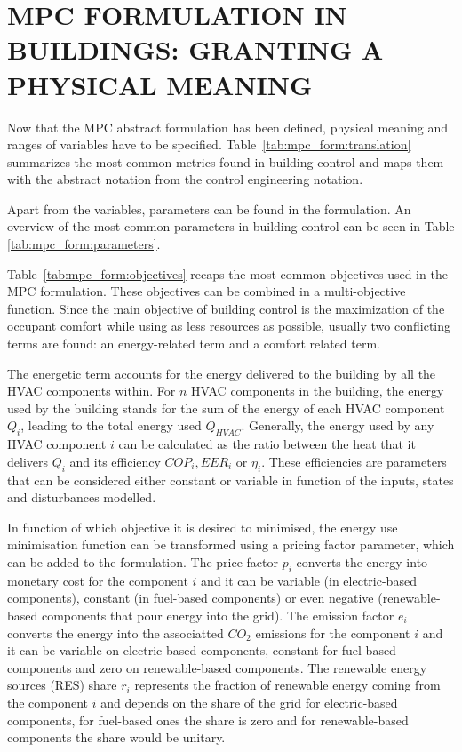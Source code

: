 \documentclass[10pt]{extarticle}
\begin{document}
\section{MPC FORMULATION IN BUILDINGS: GRANTING A PHYSICAL MEANING }

Now that the MPC abstract formulation has been defined, 
physical meaning and ranges of variables have to be specified.
Table~\ref{tab:mpc_form:translation} summarizes the most common
metrics found in building control and maps them with the abstract
notation from the control engineering notation. 

Apart from the variables, parameters can be found in the formulation. 
An overview of the most common parameters in building control can be seen in Table
\ref{tab:mpc_form:parameters}.

Table~\ref{tab:mpc_form:objectives} recaps the most common objectives used 
in the MPC formulation. These objectives can be combined in a multi-objective
function. Since the main objective of building control is the maximization of 
the occupant comfort while using as less resources as possible,
usually two conflicting terms are found: an energy-related term
and a comfort related term.   
 
The energetic term accounts for the energy delivered to the building by all
the HVAC components within. For $n$ HVAC components in the building, 
the energy used by the building stands for the sum of the energy of each
HVAC component $Q_i$, leading to the total energy used $Q_{HVAC}$.
Generally, the energy used by any HVAC component $i$ can be calculated as the
ratio between the heat that it delivers $Q_i$ and its efficiency $COP_i, EER_i$ or $\eta_i$. 
These efficiencies are parameters that can be considered either constant or variable
in function of the inputs, states and disturbances modelled.

In function of which objective it is desired to minimised, the energy use
minimisation function can be transformed using a pricing factor parameter,
which can be added to the formulation. 
The price factor $p_i$ converts the energy into monetary cost 
for the component $i$ and it can be variable
(in electric-based components), constant (in fuel-based components) or even negative 
(renewable-based components that pour energy into the grid).
The emission factor $e_i$ converts the energy into the associatted $CO_2$ emissions 
for the component $i$ and it can be variable on electric-based components,
constant for fuel-based components and zero on renewable-based components.
The renewable energy sources (RES) share $r_i$ represents the fraction of renewable
energy coming from the component $i$ and depends on the share of the grid for
electric-based components, for fuel-based ones the share is zero and for
renewable-based components the share would be unitary.
\end{document}

